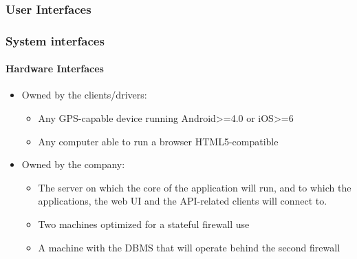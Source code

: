 \documentclass{article}
\begin{document}
\subsubsection{User Interfaces}
\subsubsection{System interfaces}

\paragraph{Hardware Interfaces}
\begin{itemize}
\item Owned by the clients/drivers:
	\begin{itemize}
		\item Any GPS-capable device running Android>=4.0 or iOS>=6
		\item Any computer able to run a browser HTML5-compatible
	\end{itemize}
\item Owned by the company:
	\begin{itemize}
		\item The server on which the core of the application will run, and to which the applications, 
			the web UI and the API-related clients will connect to.
		\item Two machines optimized for a stateful firewall use
		\item A machine with the DBMS that will operate behind the second firewall 
	\end{itemize}
\end{itemize}
\end{document}
